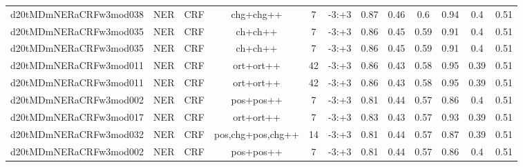 \documentclass[a4paper]{article}
\begin{document}
\begin{landscape}
\begin{center}
\begin{tabular}{ |c|c|c|c|c|c|c|c|c|c|c|c|}
 	
 
 	
 		
 		\small{ d20tMDmNERaCRFw3mod038 } & NER & CRF & chg+chg++  &  7 &  -3:+3  &  0.87 & 0.46 & 0.6  &  0.94 & 0.4 & 0.51 \\
 		

 	
 
 	
 		
 		\small{ d20tMDmNERaCRFw3mod035 } & NER & CRF & ch+ch++  &  7 &  -3:+3  &  0.86 & 0.45 & 0.59  &  0.91 & 0.4 & 0.51 \\
 		

 	
 
 	
 		
 		\small{ d20tMDmNERaCRFw3mod035 } & NER & CRF & ch+ch++  &  7 &  -3:+3  &  0.86 & 0.45 & 0.59  &  0.91 & 0.4 & 0.51 \\
 		

 	
 
 	
 		
 		\small{ d20tMDmNERaCRFw3mod011 } & NER & CRF & ort+ort++  &  42 &  -3:+3  &  0.86 & 0.43 & 0.58  &  0.95 & 0.39 & 0.51 \\
 		

 	
 
 	
 		
 		\small{ d20tMDmNERaCRFw3mod011 } & NER & CRF & ort+ort++  &  42 &  -3:+3  &  0.86 & 0.43 & 0.58  &  0.95 & 0.39 & 0.51 \\
 		

 	
 
 	
 		
 		\small{ d20tMDmNERaCRFw3mod002 } & NER & CRF & pos+pos++  &  7 &  -3:+3  &  0.81 & 0.44 & 0.57  &  0.86 & 0.4 & 0.51 \\
 		

 	
 
 	
 		
 		\small{ d20tMDmNERaCRFw3mod017 } & NER & CRF & ort+ort++  &  7 &  -3:+3  &  0.83 & 0.43 & 0.57  &  0.93 & 0.39 & 0.51 \\
 		

 	
 
 	
 		
 		\small{ d20tMDmNERaCRFw3mod032 } & NER & CRF & pos,chg+pos,chg++  &  14 &  -3:+3  &  0.81 & 0.44 & 0.57  &  0.87 & 0.39 & 0.51 \\
 		

 	
 
 	
 		
 		\small{ d20tMDmNERaCRFw3mod002 } & NER & CRF & pos+pos++  &  7 &  -3:+3  &  0.81 & 0.44 & 0.57  &  0.86 & 0.4 & 0.51 \\
 		


\end{tabular}
\end{center}
\end{landscape}
\end{document}
